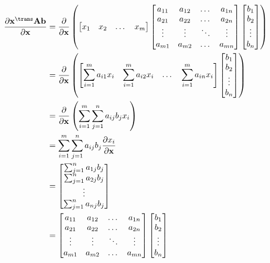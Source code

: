 \begin{align}
    \dfrac{\partial \mathbf{x}^\trans \mathbf{A} \mathbf{b}}{\partial \mathbf{x}} &= \dfrac{\partial}{\partial \mathbf{x}} \left(
    \begin{bmatrix}
        x_{1} & x_{2} & \dots & x_{m}
    \end{bmatrix}
    \begin{bmatrix}
        a_{11} & a_{12} & \dots & a_{1n} \\
        a_{21} & a_{22} & \dots & a_{2n} \\
        \vdots & \vdots & \ddots & \vdots \\
        a_{m1} & a_{m2} & \dots & a_{mn} \\
    \end{bmatrix} \begin{bmatrix}
        b_{1} \\ b_{2} \\ \vdots \\ b_{n}
    \end{bmatrix} \right) \\
    &= \dfrac{\partial}{\partial \mathbf{x}} \left(
			\begin{bmatrix}
				\displaystyle \sum_{i = 1}^{m} a_{i1}x_{i} & 
				\displaystyle \sum_{i = 1}^{m} a_{i2}x_{i} & 
				\dots & 
				\displaystyle \sum_{i = 1}^{m} a_{in}x_{i}
			\end{bmatrix} \begin{bmatrix}
				b_{1} \\ b_{2} \\ \vdots \\ b_{n}
			\end{bmatrix} \right) \\
    &= \dfrac{\partial}{\partial \mathbf{x}} \left(
        \sum_{i = 1}^{m}\sum_{j = 1}^{n} a_{ij} b_{j} x_{i}
    \right) \\
    &= \sum_{i = 1}^{m}\sum_{j = 1}^{n} a_{ij} b_{j} \dfrac{\partial x_{i}}{\partial \mathbf{x}} \\
    &= \begin{bmatrix}
        \sum_{j = 1}^{n} a_{1j} b_{j} \\
        \sum_{j = 1}^{n} a_{2j} b_{j} \\
        \vdots \\
        \sum_{j = 1}^{n} a_{nj} b_{j} \\
    \end{bmatrix} \\
    &= \begin{bmatrix}
        a_{11} & a_{12} & \dots & a_{1n} \\
        a_{21} & a_{22} & \dots & a_{2n} \\
        \vdots & \vdots & \ddots & \vdots \\
        a_{m1} & a_{m2} & \dots & a_{mn} \\
    \end{bmatrix}
    \begin{bmatrix}
        b_1 \\
        b_2 \\
        \vdots \\
        b_n
    \end{bmatrix}
\end{align}
